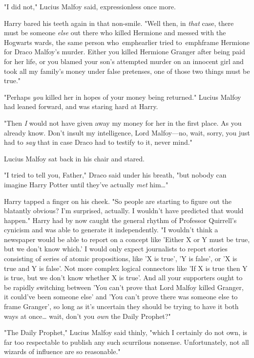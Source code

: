 "I did not," Lucius Malfoy said, expressionless once more.

Harry bared his teeth again in that non-smile. "Well then, in \emph{that} case, 
there must be someone \emph{else} out there who killed Hermione and messed with 
the Hogwarts wards, the same person who\ emph{earlier} tried to\ emph{frame 
Hermione for Draco Malfoy's murder.} Either you killed Hermione Granger after 
being paid for her life, or you blamed your son's attempted murder on an 
innocent girl and took all my family's money under false pretenses, one of 
those two things must be true."

"Perhaps \emph{you} killed her in hopes of your money being returned." Lucius 
Malfoy had leaned forward, and was staring hard at Harry.

"Then \emph{I} would not have given away my money for her in the first place. 
As you already know. Don't insult my intelligence, Lord Malfoy---no, wait, 
sorry, you just had to \emph{say} that in case Draco had to testify to it, 
never mind."

Lucius Malfoy sat back in his chair and stared.

"I tried to tell you, Father," Draco said under his breath, "but nobody can 
imagine Harry Potter until they've actually \emph{met} him{\ldots}"

Harry tapped a finger on his cheek. "So people are starting to figure out the 
blatantly obvious? I'm surprised, actually. I wouldn't have predicted that 
would happen." Harry had by now caught the general rhythm of Professor 
Quirrell's cynicism and was able to generate it independently. "I wouldn't 
think a newspaper would be able to report on a concept like 'Either X or Y must 
be true, but we don't know which.' I would only expect journalists to report 
stories consisting of series of atomic propositions, like 'X is true', 'Y is 
false', or 'X is true and Y is false'. Not more complex logical connectors like 
'If X is true then Y is true, but we don't know whether X is true'. And all 
your supporters ought to be rapidly switching between 'You can't prove that 
Lord Malfoy killed Granger, it could've been someone else' and 'You can't prove 
there was someone else to frame Granger', so long as it's uncertain they should 
be trying to have it both ways at once{\ldots} wait, don't you \emph{own} the 
Daily Prophet?"

"The Daily Prophet," Lucius Malfoy said thinly, "which I certainly do not own, 
is far too respectable to publish any such scurrilous nonsense. Unfortunately, 
not all wizards of influence are so reasonable."


